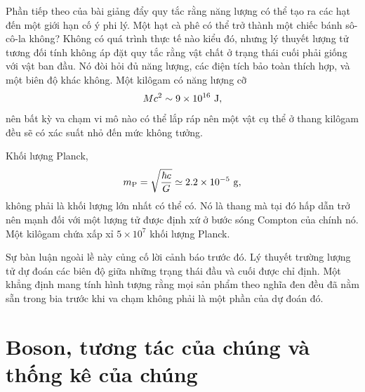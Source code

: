 Phần tiếp theo của bài giảng đẩy quy tắc rằng năng lượng có thể tạo ra các hạt đến một
giới hạn cố ý phi lý. Một hạt cà phê có thể trở thành một chiếc bánh sô-cô-la không?
Không có quá trình thực tế nào kiểu đó, nhưng lý thuyết lượng tử tương đối tính
không áp đặt quy tắc rằng vật chất ở trạng thái cuối phải giống với vật ban đầu. Nó
đòi hỏi đủ năng lượng, các điện tích bảo toàn thích hợp, và một biên độ khác không.
Một kilôgam có năng lượng cỡ
\begin{equation}
  Mc^2\sim9\times10^{16}\ {\rm J},
\end{equation}
nên bất kỳ va chạm vi mô nào có thể lắp ráp nên một vật cụ thể ở thang kilôgam
đều sẽ có xác suất nhỏ đến mức không tưởng.

Khối lượng Planck,
\begin{equation}
  m_{\rm P}=\sqrt{\frac{\hbar c}{G}}
  \simeq2.2\times10^{-5}\ {\rm g},
\end{equation}
không phải là khối lượng lớn nhất có thể có. Nó là thang mà tại đó hấp dẫn trở nên
mạnh đối với một lượng tử được định xứ ở bước sóng Compton của chính nó. Một kilôgam chứa
xấp xỉ \(5\times10^7\) khối lượng Planck.

\begin{classroomqa}
\end{classroomqa}

Sự bàn luận ngoài lề này củng cố lời cảnh báo trước đó. Lý thuyết trường lượng tử dự đoán
các biên độ giữa những trạng thái đầu và cuối được chỉ định. Một khẳng định
mang tính hình tượng rằng mọi sản phẩm theo nghĩa đen đều đã nằm sẵn trong bia trước khi va chạm
không phải là một phần của dự đoán đó.

\section{Boson, tương tác của chúng và thống kê của chúng}

